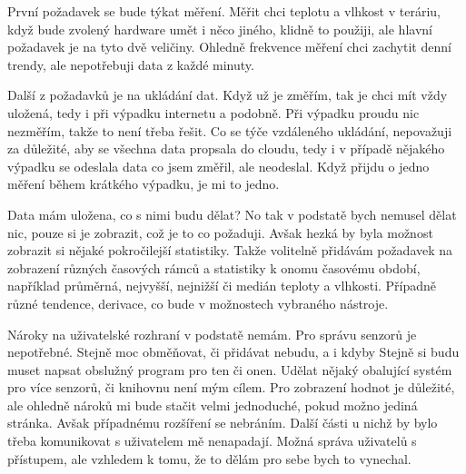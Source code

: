 
První požadavek se bude týkat měření. Měřit chci teplotu a vlhkost v teráriu, když bude zvolený hardware umět i něco 
jiného, klidně to použiji, ale hlavní požadavek je na tyto dvě veličiny. Ohledně frekvence měření chci zachytit denní 
trendy, ale nepotřebuji data z každé minuty.

Další z požadavků je na ukládání dat. Když už je změřím, tak je chci mít vždy uložená, tedy i při výpadku internetu 
a podobně. Při výpadku proudu nic nezměřím, takže to není třeba řešit. Co se týče vzdáleného ukládání, nepovažuji za 
důležité, aby se všechna data propsala do cloudu, tedy i v případě nějakého výpadku se odeslala data co jsem změřil, ale 
neodeslal. Když přijdu o jedno měření během krátkého výpadku, je mi to jedno.%

Data mám uložena, co s nimi budu dělat? No tak v podstatě bych nemusel dělat nic, pouze si je zobrazit, což je to co 
požaduji. Avšak hezká by byla možnost zobrazit si nějaké pokročilejší statistiky. Takže volitelně přidávám požadavek na 
zobrazení různých časových rámců a statistiky k onomu časovému období, například průměrná, nejvyšší, nejnižší či medián 
teploty a vlhkosti. Případně různé tendence, derivace, co bude v možnostech vybraného nástroje.

Nároky na uživatelské rozhraní v podstatě nemám. Pro správu senzorů je nepotřebné. Stejně moc obměňovat, či přidávat 
nebudu, a i kdyby Stejně si budu muset napsat obslužný program pro ten či onen. Udělat nějaký obalující systém pro více 
senzorů, či knihovnu není mým cílem. Pro zobrazení hodnot je důležité, ale ohledně nároků mi bude stačit velmi 
jednoduché, pokud možno jediná stránka. Avšak případnému rozšíření se nebráním. Další části u nichž by bylo třeba 
komunikovat s uživatelem mě nenapadají. Možná správa uživatelů s přístupem, ale vzhledem k tomu, že to dělám pro sebe 
bych to vynechal.

